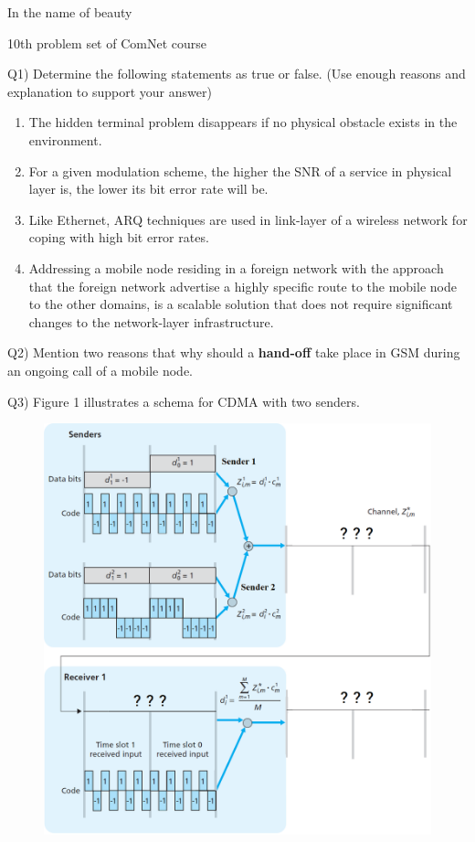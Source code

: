 \documentclass[10pt,letterpaper]{article}
\begin{document}
\Large
\begin{center}
In the name of beauty

10th problem set of ComNet course

\hrulefill
\end{center}
Q1) Determine the following statements as true or false. (Use enough reasons and explanation to support your answer)

\begin{enumerate}[label=\alph*-]
\item
The hidden terminal problem disappears if no physical obstacle exists in the environment.
\item
For a given modulation scheme, the higher the SNR of a service in physical layer is, the lower its bit error rate will be.
\item
Like Ethernet, ARQ techniques are used in link-layer of a wireless network for coping with high bit error rates.
\item
Addressing a mobile node residing in a foreign network with the approach that the foreign network advertise a highly specific route to the mobile node to the other domains, is a scalable solution that does not require significant changes to the network-layer infrastructure.
\end{enumerate}

Q2) Mention two reasons that why should a \textbf{hand-off} take place in GSM during an ongoing call of a mobile node.

Q3) Figure 1 illustrates a schema for CDMA with two senders.
\begin{figure}[htbp]
\centering
\includegraphics[width=130mm]{CDMA_TXRX.png}
\caption{}
\end{figure}
\end{document}
